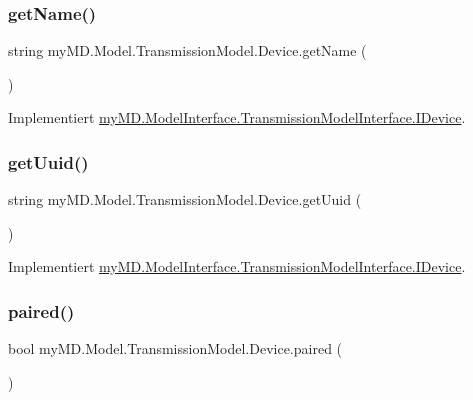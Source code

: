 \subsubsection{\texorpdfstring{get\+Name()}{getName()}}
{\footnotesize\ttfamily string my\+M\+D.\+Model.\+Transmission\+Model.\+Device.\+get\+Name (\begin{DoxyParamCaption}{ }\end{DoxyParamCaption})}



Implementiert \mbox{\hyperlink{interfacemy_m_d_1_1_model_interface_1_1_transmission_model_interface_1_1_i_device_a0642c516236dc1a58f6199a47f174427}{my\+M\+D.\+Model\+Interface.\+Transmission\+Model\+Interface.\+I\+Device}}.

\mbox{\label{classmy_m_d_1_1_model_1_1_transmission_model_1_1_device_a84a4d532edd011e5eabd0b6939b1e91c}} 
\subsubsection{\texorpdfstring{get\+Uuid()}{getUuid()}}
{\footnotesize\ttfamily string my\+M\+D.\+Model.\+Transmission\+Model.\+Device.\+get\+Uuid (\begin{DoxyParamCaption}{ }\end{DoxyParamCaption})}



Implementiert \mbox{\hyperlink{interfacemy_m_d_1_1_model_interface_1_1_transmission_model_interface_1_1_i_device_a59013bc25e4ab2ef413e940d6e7c735f}{my\+M\+D.\+Model\+Interface.\+Transmission\+Model\+Interface.\+I\+Device}}.

\mbox{\label{classmy_m_d_1_1_model_1_1_transmission_model_1_1_device_af8485fc857a036d58e8b1ba38e7d098a}} 
\subsubsection{\texorpdfstring{paired()}{paired()}}
{\footnotesize\ttfamily bool my\+M\+D.\+Model.\+Transmission\+Model.\+Device.\+paired (\begin{DoxyParamCaption}{ }\end{DoxyParamCaption})}



